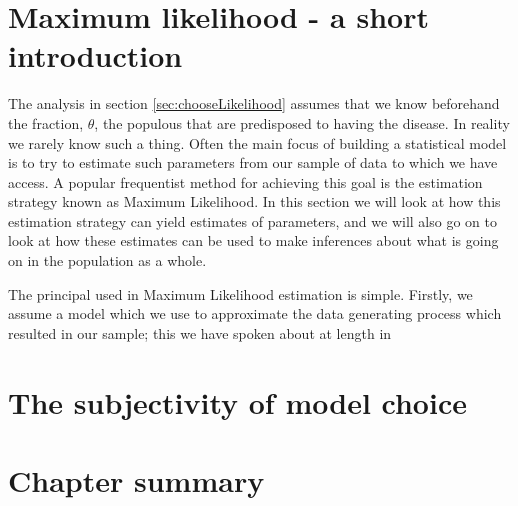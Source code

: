 \documentclass[11pt,fullpage]{book}
\begin{document}
\section{Maximum likelihood - a short introduction}\label{sec:Likelihood_MLE}
The analysis in section \ref{sec:chooseLikelihood} assumes that we know beforehand the fraction, $\theta$, the populous that are predisposed to having the disease. In reality we rarely know such a thing. Often the main focus of building a statistical model is to try to estimate such parameters from our sample of data to which we have access. A popular frequentist method for achieving this goal is the estimation strategy known as Maximum Likelihood. In this section we will look at how this estimation strategy can yield estimates of parameters, and we will also go on to look at how these estimates can be used to make inferences about what is going on in the population as a whole.

The principal used in Maximum Likelihood estimation is simple. Firstly, we assume a model which we use to approximate the data generating process which resulted in our sample; this we have spoken about at length in 

\section{The subjectivity of model choice}

\section{Chapter summary}




\end{document}
